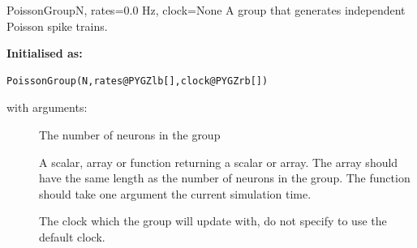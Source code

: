 \documentclass[letterpaper,10pt,english]{manual}
\begin{document}
\hypertarget{brian.PoissonGroup}{}\begin{classdesc}{PoissonGroup}{N, rates=0.0 Hz, clock=None}
A group that generates independent Poisson spike trains.

\textbf{Initialised as:}

\begin{Verbatim}[commandchars=@\[\]]
PoissonGroup(N,rates@PYGZlb[],clock@PYGZrb[])
\end{Verbatim}

with arguments:
\begin{description}
\item[] \leavevmode
The number of neurons in the group

\item[] \leavevmode
A scalar, array or function returning a scalar or array.
The array should have the same length as the number of
neurons in the group. The function should take one
argument  the current simulation time.

\item[] \leavevmode
The clock which the group will update with, do not
specify to use the default clock.

\end{description}
\end{classdesc}
\end{document}
